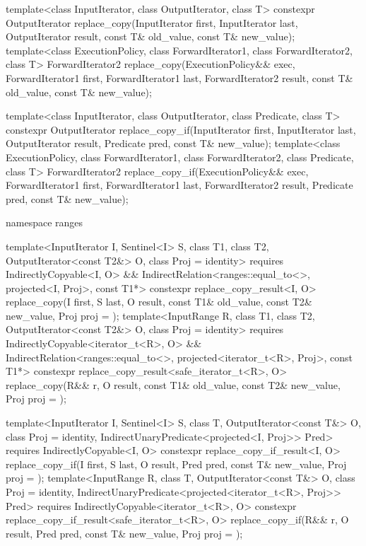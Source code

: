 %
%
\begin{itemdecl}
template<class InputIterator, class OutputIterator, class T>
  constexpr OutputIterator
    replace_copy(InputIterator first, InputIterator last,
                 OutputIterator result,
                 const T& old_value, const T& new_value);
template<class ExecutionPolicy, class ForwardIterator1, class ForwardIterator2, class T>
  ForwardIterator2
    replace_copy(ExecutionPolicy&& exec,
                 ForwardIterator1 first, ForwardIterator1 last,
                 ForwardIterator2 result,
                 const T& old_value, const T& new_value);

template<class InputIterator, class OutputIterator, class Predicate, class T>
  constexpr OutputIterator
    replace_copy_if(InputIterator first, InputIterator last,
                    OutputIterator result,
                    Predicate pred, const T& new_value);
template<class ExecutionPolicy, class ForwardIterator1, class ForwardIterator2,
         class Predicate, class T>
  ForwardIterator2
    replace_copy_if(ExecutionPolicy&& exec,
                    ForwardIterator1 first, ForwardIterator1 last,
                    ForwardIterator2 result,
                    Predicate pred, const T& new_value);

namespace ranges {
  template<InputIterator I, Sentinel<I> S, class T1, class T2, OutputIterator<const T2&> O,
      class Proj = identity>
    requires IndirectlyCopyable<I, O> &&
      IndirectRelation<ranges::equal_to<>, projected<I, Proj>, const T1*>
    constexpr replace_copy_result<I, O>
      replace_copy(I first, S last, O result, const T1& old_value, const T2& new_value,
                   Proj proj = {});
  template<InputRange R, class T1, class T2, OutputIterator<const T2&> O,
      class Proj = identity>
    requires IndirectlyCopyable<iterator_t<R>, O> &&
      IndirectRelation<ranges::equal_to<>, projected<iterator_t<R>, Proj>, const T1*>
    constexpr replace_copy_result<safe_iterator_t<R>, O>
      replace_copy(R&& r, O result, const T1& old_value, const T2& new_value,
                   Proj proj = {});

  template<InputIterator I, Sentinel<I> S, class T, OutputIterator<const T&> O,
      class Proj = identity, IndirectUnaryPredicate<projected<I, Proj>> Pred>
    requires IndirectlyCopyable<I, O>
    constexpr replace_copy_if_result<I, O>
      replace_copy_if(I first, S last, O result, Pred pred, const T& new_value,
                      Proj proj = {});
  template<InputRange R, class T, OutputIterator<const T&> O, class Proj = identity,
      IndirectUnaryPredicate<projected<iterator_t<R>, Proj>> Pred>
    requires IndirectlyCopyable<iterator_t<R>, O>
    constexpr replace_copy_if_result<safe_iterator_t<R>, O>
      replace_copy_if(R&& r, O result, Pred pred, const T& new_value,
                      Proj proj = {});
}
\end{itemdecl}

